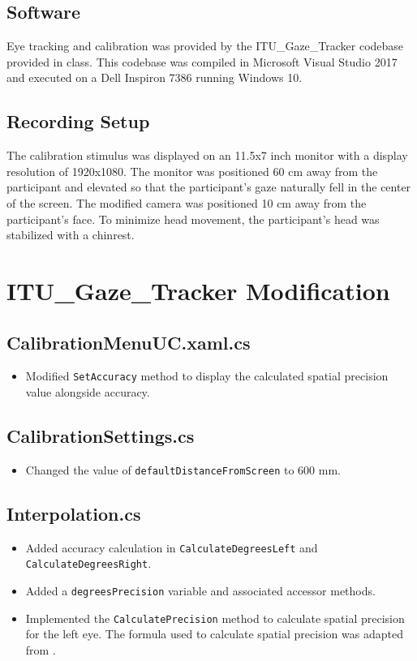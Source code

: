 \documentclass[11pt]{article}
\begin{document}
\subsection{Software}
\label{subsec:software}
Eye tracking and calibration was provided by the ITU\_Gaze\_Tracker codebase
provided in class.
This codebase was compiled in Microsoft Visual Studio 2017 and executed on a
Dell Inspiron 7386 running Windows 10.

\subsection{Recording Setup}
\label{subsec:recording_setup}
The calibration stimulus was displayed on an 11.5x7 inch monitor with a display
resolution of 1920x1080.
The monitor was positioned 60 cm away from the participant and elevated so that
the participant's gaze naturally fell in the center of the screen.
The modified camera was positioned 10 cm away from the participant's face.
To minimize head movement, the participant's head was stabilized with a chinrest.

\section{ITU\_Gaze\_Tracker Modification}
\label{sec:itu_gaze_tracker_modification} %
\subsection*{CalibrationMenuUC.xaml.cs}
    \begin{itemize}
        \item Modified \texttt{SetAccuracy} method to display the calculated spatial precision value alongside accuracy.
    \end{itemize}
\subsection*{CalibrationSettings.cs}
    \begin{itemize}
        \item Changed the value of \texttt{defaultDistanceFromScreen} to 600 mm.
    \end{itemize}
\subsection*{Interpolation.cs}
 \begin{itemize}
    \item Added accuracy calculation in \texttt{CalculateDegreesLeft} and \texttt{CalculateDegreesRight}.
    \item Added a \texttt{degreesPrecision} variable and associated accessor methods. 
    \item Implemented the \texttt{CalculatePrecision} method to calculate spatial precision for the left eye. The formula used to calculate spatial precision was adapted from \cite{Holmqvist}.
 \end{itemize}
\end{document}
